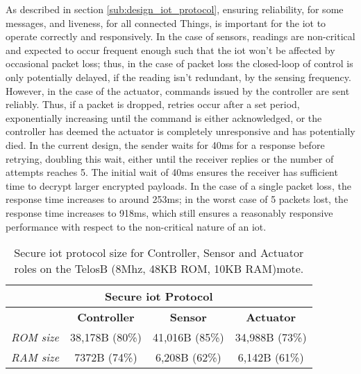 \documentclass{mpaper}
\begin{document}
As described in section \ref{sub:design_iot_protocol}, ensuring reliability, for some messages, and liveness, for all connected Things, is important for the iot to operate correctly and responsively. In the case of sensors, readings are non-critical and expected to occur frequent enough such that the iot won't be affected by occasional packet loss; thus, in the case of packet loss the closed-loop of control is only potentially delayed, if the reading isn't redundant, by the sensing frequency. However, in the case of the actuator, commands issued by the controller are sent reliably. Thus, if a packet is dropped, retries occur after a set period, exponentially increasing until the command is either acknowledged, or the controller has deemed the actuator is completely unresponsive and has potentially died. In the current design, the sender waits for 40ms for a response before retrying, doubling this wait, either until the receiver replies or the number of attempts reaches 5. The initial wait of 40ms ensures the receiver has sufficient time to decrypt larger encrypted payloads. In the case of a single packet loss, the response time increases to around 253ms; in the worst case of 5 packets lost, the response time increases to 918ms, which still ensures a reasonably responsive performance with respect to the non-critical nature of an iot.
\begin{table*}[h!] %
  \begin{center} 
  \begin{tabular}{|c|c|c|c|} 
  \hline
  \multicolumn{4}{|c|}{\textbf{Secure iot Protocol}}\\ \hline
                    & \textbf{Controller} & \textbf{Sensor} & \textbf{Actuator} \\ \hline
  \textit{ROM size} & 38,178B (80\%)      & 41,016B (85\%)  & 34,988B (73\%)    \\ \hline
  \textit{RAM size} & 7372B (74\%)        & 6,208B  (62\%)  & 6,142B  (61\%)    \\ \hline
  \end{tabular}
  \caption[Table]{Secure iot protocol size for Controller, Sensor and Actuator roles on the TelosB (8Mhz, 48KB ROM, 10KB RAM)mote.}
  \label{tab:implementation}
  \end{center}
\end{table*}
\end{document}
